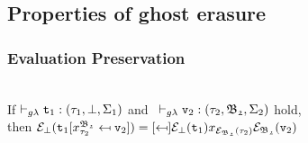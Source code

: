 \subsection{Properties of ghost erasure}
%
%
%



\subsubsection{Evaluation Preservation}
\begin{lemma} ~\\
If $\typrule
		{\texttt{t}_{1}}
		{\tau_{1}}
		{\bot}
		{\Sigma_1}$  
and 
	\mbox{
		$\typrule
			{\texttt{v}_{2}}
			{\tau_{2}}
			{\mathfrak{B_{2}}}
			{\Sigma_2}$}	
hold, \\ 
then
$\e_{\bot}
	(\sbst
		{\texttt{t}_{1}}
		{x^{\mathfrak{B_{2}}}_{\tau_{2}}}
		{\texttt{v}_{2}})
= \sbst
		{\e_{\bot}(\texttt{t}_{1})}
		{x_{\e_{\mathfrak{B_{2}}}(\tau_{2})}}
		{\e_{\mathfrak{B_{2}}}(\texttt{v}_{2})}$
\label{Substitution under erasure}
\end{lemma}

